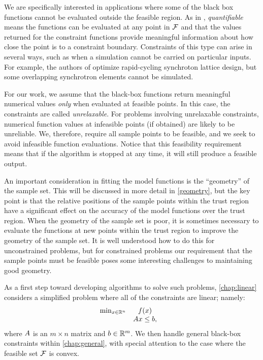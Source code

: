 We are specifically interested in applications where some of the black box functions cannot be evaluated outside the feasible region.
As in \cite{digabel2015taxonomy}, {\em quantifiable} means the functions can be evaluated at any point in ${\mathcal F}$ 
and that the values returned for the constraint functions provide meaningful information about how close the point is to a constraint boundary.
Constraints of this type can arise in several ways, such as when a simulation cannot be carried on particular inputs.
For example, the authors of \cite{Padidar2021} optimize rapid-cycling synchroton lattice design,
but some overlapping synchrotron elements cannot be simulated.

For our work, we assume that the black-box functions return meaningful numerical values \emph{only} when evaluated at feasible points.
In this case,  the constraints are called {\em unrelaxable}.    
For problems involving unrelaxable constraints,  numerical function values at infeasible points (if obtained) are likely to be unreliable.
We, therefore, require all sample points to be feasible, and we seek to avoid infeasible function evaluations.
Notice that this feasibility requirement means that if the algorithm is stopped at any time, it will still produce a feasible output.


An important consideration in fitting the model functions is the ``geometry'' of the sample set.
This will be discussed in more detail in \cref{geometry}, but the key point is that the relative positions of the sample points within the trust region have a significant effect on the accuracy of the model functions over the trust region.
When the geometry of the sample set is poor, it is sometimes necessary to evaluate the functions at new points within the trust region to improve the geometry of the sample set.
It is well understood how to do this for unconstrained problems, but for constrained problems
our requirement that the sample points must be feasible poses some interesting challenges to maintaining good geometry.   

As a first step toward developing algorithms to solve such problems, \cref{chap:linear}  considers a simplified problem where all of the constraints are linear; namely:
\begin{align*}
\begin{array}{ccl} \min_{x \in \mathbb R^n} & f(x) \\
& {A} x \le {b}, & 
\end{array}
\end{align*}
where ${A}$ is an $m \times n$ matrix and ${b} \in \mathbb R^m$.
We then handle general black-box constraints within \cref{chap:general}, 
with special attention to the case where the feasible set ${\mathcal F}$ is convex.

